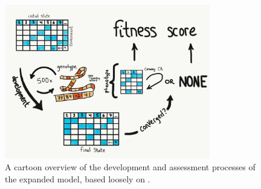 \begin{figure}
    \centering
    \includegraphics[width=0.8\textwidth]{img/complete_schematic}
 	\captionsetup{singlelinecheck=off,justification=raggedright}
  	\caption{A cartoon overview of the development and assessment processes of the expanded model, based loosely on \cite{Wilder2015ReconcilingEvolvability}.}
    \label{fig:complete_schematic}
\end{figure}